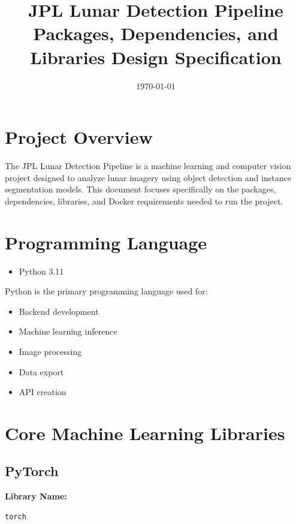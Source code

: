 \documentclass[12pt]{article}
\title{JPL Lunar Detection Pipeline\\Packages, Dependencies, and Libraries Design Specification}
\date{\today}
\begin{document}
\maketitle

\tableofcontents

\newpage

\section{Project Overview}

The JPL Lunar Detection Pipeline is a machine learning and computer vision
project designed to analyze lunar imagery using object detection and
instance segmentation models. This document focuses specifically on the
packages, dependencies, libraries, and Docker requirements needed to run
the project.

\section{Programming Language}

\begin{itemize}
    \item Python 3.11
\end{itemize}

Python is the primary programming language used for:
\begin{itemize}
    \item Backend development
    \item Machine learning inference
    \item Image processing
    \item Data export
    \item API creation
\end{itemize}

\section{Core Machine Learning Libraries}

\subsection{PyTorch}

\textbf{Library Name:}
\begin{verbatim}
torch
\end{verbatim}
\end{document}
